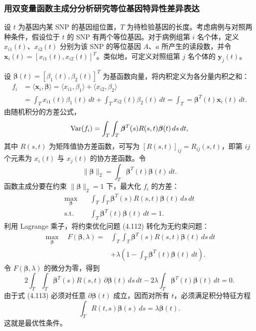 \subsubsection{用双变量函数主成分分析研究等位基因特异性差异表达}
设 $t$ 为基因内某 SNP 的基因组位置，$T$ 为待检验基因的长度。考虑病例与对照两种条件，假设位于 $t$ 的 SNP 有两个等位基因。对于病例组第 $i$ 名个体，定义 $x_{i1}(t)$、$x_{i2}(t)$ 分别为该 SNP 的等位基因 $A$、$a$ 所产生的读段数，并令 $\mathbf x_i(t)=[x_{i1}(t),x_{i2}(t)]^T$。类似地，可定义对照组第 $j$ 名个体的 $\mathbf y_j(t)$。

设 $\boldsymbol\beta(t)=[\beta_1(t),\beta_2(t)]^T$ 为基函数向量，将内积定义为各分量内积之和：
\[
\begin{aligned}
f_i&=\langle\mathbf x_i,\boldsymbol\beta\rangle
=\langle x_{i1},\beta_1\rangle+\langle x_{i2},\beta_2\rangle\\
&=\int_T x_{i1}(t)\beta_1(t)\,dt+\int_T x_{i2}(t)\beta_2(t)\,dt
=\int_T=\boldsymbol\beta^T(t)\mathbf x_i(t)\,dt.
\end{aligned}
\]
由随机积分的方差公式，
\[
\operatorname{Var}(f_i)=\int_T\int_T\boldsymbol\beta^T(s)R(s,t)\boldsymbol\beta(t)\,ds\,dt,
\]
其中 $R(s,t)$ 为矩阵值协方差函数，可写为 $[R(s,t)]_{ij}=R_{ij}(s,t)$，即第 $ij$ 个元素为 $x_i(t)$ 与 $x_j(t)$ 的协方差函数。令
\[
\lVert\boldsymbol\beta\rVert_2=\int_T\boldsymbol\beta^T(t)\boldsymbol\beta(t)\,dt.
\]
函数主成分要在约束 $\lVert\boldsymbol\beta\rVert_2=1$ 下，最大化 $f_i$ 的方差：
\begin{equation}
\begin{aligned}
\max_{\boldsymbol\beta}\quad&\int_T\int_T
\boldsymbol\beta^T(s)R(s,t)\boldsymbol\beta(t)\,ds\,dt\\
\text{s.t.}\quad&\int_T\boldsymbol\beta^T(t)\boldsymbol\beta(t)\,dt=1.
\end{aligned}
\tag{4.112}
\end{equation}
利用 Lagrange 乘子，将约束优化问题 (4.112) 转化为无约束问题：
\[
\begin{aligned}
\max_{\boldsymbol\beta}\quad F(\boldsymbol\beta,\lambda)
={}&\int_T\int_T\boldsymbol\beta^T(s)R(s,t)\boldsymbol\beta(t)\,ds\,dt\\
&+\lambda\left(1-\int_T\boldsymbol\beta^T(t)\boldsymbol\beta(t)\,dt\right).
\end{aligned}
\]
令 $F(\boldsymbol\beta,\lambda)$ 的微分为零，得到
\begin{equation}
2\int_T\int_T\boldsymbol\beta^T(s)R(s,t)\,\partial\boldsymbol\beta(t)\,ds\,dt
-2\lambda\int_T\boldsymbol\beta^T(t)\boldsymbol\beta(t)\,dt=0.
\tag{4.113}
\end{equation}
由于式 (4.113) 必须对任意 $\partial\boldsymbol\beta(t)$ 成立，因而对所有 $t$，必须满足积分特征方程
\begin{equation}
\int_T R(t,s)\boldsymbol\beta(s)\,ds=\lambda\boldsymbol\beta(t).
\tag{4.114}
\end{equation}
这就是最优性条件。

